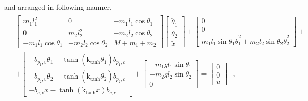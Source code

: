  and arranged in following manner,
%
\begingroup\makeatletter\def\f@size{10}\check@mathfonts
\def\maketag@@@#1{\hbox{\m@th\normalsize\normalfont#1}}%
\begin{align}
  \begin{split}
    &
    \begin{bmatrix}
      m_1 l_1^2              & 0                       &  -m_1 l_1 \cos \theta_1 \\
      0                      & m_2 l_2^2               &  -m_2 l_2 \cos \theta_2\\
      -m_1 l_1 \cos \theta_1 & -m_2 l_2 \cos \theta_2  &  M + m_1 + m_2
    \end{bmatrix}
    \begin{bmatrix}
      \ddot{\theta}_1  \\
      \ddot{\theta}_2  \\
      \ddot{x}
    \end{bmatrix}
    +
    \begin{bmatrix}
    0  \\
    0  \\
    m_1 l_1 \sin \theta_1 \dot{\theta}_1^2 + m_2 l_2 \sin \theta_2 \dot{\theta}_2^2
    \end{bmatrix}
    +   \\
    &+
    \begin{bmatrix}
      -b_{p_1,v} \dot{\theta}_1 - \tanh(\text{k}_\text{tanh}\dot{\theta}_1) b_{p_1,c}    \\
      -b_{p_2,v} \dot{\theta}_2 - \tanh(\text{k}_\text{tanh}\dot{\theta}_2) b_{p_2,c}    \\
      -b_{c,v} \dot{x} - \tanh(\text{k}_\text{tanh}\dot{x}) b_{c,c}
    \end{bmatrix}
    +
    \begin{bmatrix}
      -m_1 g l_1 \sin \theta_1  \\
      -m_2 g l_2 \sin \theta_2  \\
      0
    \end{bmatrix}
    =
    \begin{bmatrix}
      0  \\
      0  \\
      u
    \end{bmatrix} \ \ \ , 
  \end{split}
  \label{eq:theta1Theta2Xdynamics} \\ \nonumber
\end{align}
\endgroup \vspace{-44pt}

